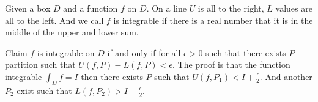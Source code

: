 \documentclass[letter]{article}
\begin{document}
Given a box $D$ and a function $f$ on $D$. On a line $U$ is all to the right, $L$ values are all to the left. And we call $f$ is integrable if there is a real number that it is in the middle of the upper and lower sum. 



Claim $f$ is integrable on $D$ if and only if for all $\epsilon > 0$ such that there exists $P$ partition such that $U(f,P) - L(f, P) < \epsilon$. 
The proof is that the function integrable $\int_D f = I$ then there exists $P$ such that $U(f, P_1) < I + \frac{\epsilon}{2}$. And another $P_2$ exist such that 
$L(f, P_2) > I - \frac{\epsilon}{2}$. 
\end{document}
